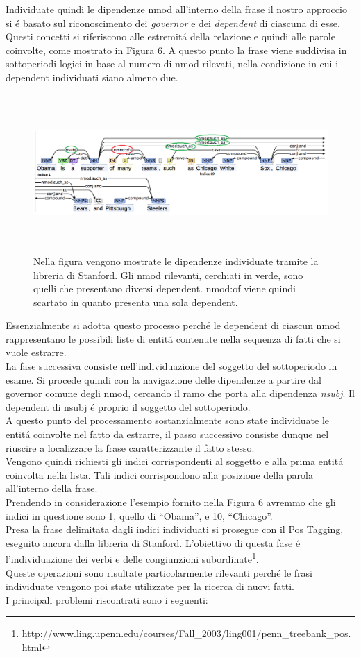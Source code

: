 \documentclass[twocolumn,10pt]{asme2ej}
\begin{document}
Individuate quindi le dipendenze nmod all'interno della frase il nostro approccio si \'e basato sul riconoscimento dei \textit{governor} e dei \textit{dependent} di ciascuna di esse. \\Questi concetti si riferiscono alle estremit\'a della relazione e quindi alle parole coinvolte, come mostrato in Figura 6. A questo punto la frase viene suddivisa in sottoperiodi logici in base al numero di nmod rilevati, nella condizione in cui i dependent individuati siano almeno due.
\begin{figure}
  \includegraphics[width=\textwidth,height=6cm]{figure/dipendenze.png}
  \caption{Nella figura vengono mostrate le dipendenze individuate tramite la libreria di Stanford. Gli nmod rilevanti, cerchiati in verde, sono quelli che presentano diversi dependent. nmod:of viene quindi scartato in quanto presenta una sola dependent.}
\end{figure}
 Essenzialmente si adotta questo processo perch\'e le dependent di ciascun nmod rappresentano le possibili liste di entit\'a contenute nella sequenza di fatti che si vuole estrarre. \\La fase successiva consiste nell'individuazione del soggetto del sottoperiodo in esame. Si procede quindi con la navigazione delle dipendenze a partire dal governor comune degli nmod, cercando il ramo che porta alla dipendenza \textit{nsubj}. Il dependent di nsubj \'e proprio il soggetto del sottoperiodo.
\\A questo punto del processamento sostanzialmente sono state individuate le entit\'a coinvolte nel fatto da estrarre, il passo successivo consiste dunque nel riuscire a localizzare la frase caratterizzante il fatto stesso. 
\\Vengono quindi richiesti gli indici corrispondenti al soggetto e alla prima entit\'a coinvolta nella lista. Tali indici corrispondono alla posizione della parola all'interno della frase. \\Prendendo in considerazione l'esempio fornito nella Figura 6 avremmo che gli indici in questione sono 1, quello di ``Obama'', e 10, ``Chicago''. \\Presa la frase delimitata dagli indici individuati si prosegue con il Pos Tagging, eseguito ancora dalla libreria di Stanford. L'obiettivo di questa fase \'e l'individuazione dei verbi e delle congiunzioni subordinate\footnote{http://www.ling.upenn.edu/courses/Fall\_2003/ling001/penn\_treebank\_pos.html}. \\ Queste operazioni sono risultate particolarmente rilevanti perch\'e le frasi individuate vengono poi state utilizzate per la ricerca di nuovi fatti. \\I principali problemi riscontrati sono i seguenti:
\end{document}
